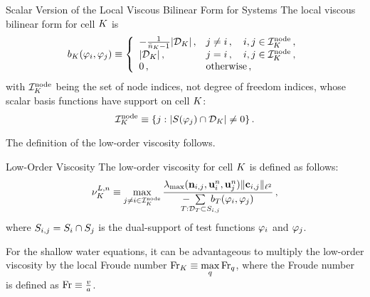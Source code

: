 \begin{definition}{Scalar Version of the Local Viscous Bilinear Form for Systems}
   The local viscous bilinear form for cell $K$ is
   \begin{equation}\label{eq:bilinearform_system}
     b_{K}(\varphi_i,\varphi_j)
       \equiv \left\{\begin{array}{l l}
         -\frac{1}{\bar{n}_K - 1}|\mathcal{D}_K|\,, & j\ne i\,,
       \quad i,j\in \mathcal{I}^{\text{node}}_K\,, \\
       |\mathcal{D}_K|\,, & j = i \,, \quad i,j\in \mathcal{I}^{\text{node}}_K\,, \\
       0          \,, & \mbox{otherwise}\,,
     \end{array}\right.
   \end{equation}
   with $\mathcal{I}^{\text{node}}_K$ being the set of node indices, not degree of
   freedom indices, whose scalar basis functions have support on cell $K$:
   \begin{equation}
     \mathcal{I}^{\text{node}}_K \equiv \{ j :
       |S(\varphi_j)\cap \mathcal{D}_K|\ne 0\}
     \,.
   \end{equation}
\end{definition}
The definition of the low-order viscosity follows.
\begin{definition}{Low-Order Viscosity}
   The low-order viscosity for cell $K$ is defined as follows:
   \begin{equation}
     \lowordercellviscosity[\timeindex] \equiv
       \max\limits_{j\ne i\in\indicesnode}
         \frac{\maxwavespeed(\normalvector_{i,j},\vectorsolution^\timeindex_i,
           \vectorsolution^\timeindex_j)\|\gradiententry\|_{\ell^2}}
         {-\mkern-20mu\sumKSij[T]\mkern-20mu\localviscbilinearform{T}{i}{j}}
     \eqc
   \end{equation}
   where $S_{i,j}=S_i\cap S_j$ is the dual-support of test
   functions $\varphi_i$ and $\varphi_j$.
\end{definition}
\begin{remark}
For the shallow water equations, it can be advantageous to multiply the low-order
viscosity by the local Froude number $\mathrm{Fr}_K\equiv\max\limits_q\mathrm{Fr}_q$,
where the Froude number is defined as $\mathrm{Fr}\equiv\frac{v}{a}$.
\end{remark}
